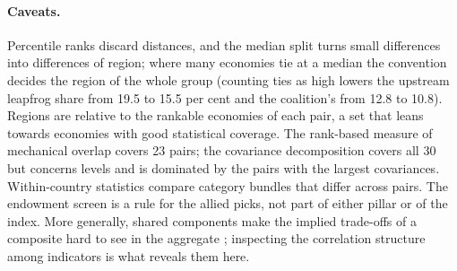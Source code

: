 \paragraph{Caveats.} Percentile ranks discard distances, and the median split turns small
differences into differences of region; where many economies tie at a median the convention
decides the region of the whole group (counting ties as high lowers the upstream leapfrog share
from 19.5 to 15.5 per cent and the coalition's from 12.8 to 10.8). Regions are relative to the
rankable economies of each pair, a set that leans towards economies with good statistical
coverage. The rank-based measure of mechanical overlap covers 23 pairs; the covariance decomposition
covers all 30 but concerns levels and is dominated by the pairs with the largest covariances.
Within-country statistics compare category bundles that differ across pairs. The endowment screen
is a rule for the allied picks, not part of either pillar or of the index. More generally, shared
components make the implied trade-offs of a composite hard to see in the aggregate
\citep{ravallion2012mashup}; inspecting the correlation structure among indicators
\citep{oecd2008handbook} is what reveals them here.

